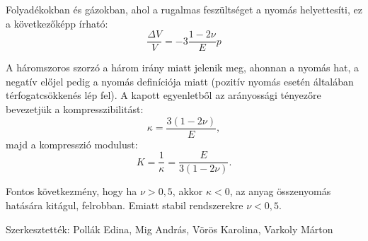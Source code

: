 \documentclass[a4paper, 12pt]{article}
\begin{document}
Folyadékokban és gázokban, ahol a rugalmas feszültséget a nyomás helyettesíti, ez a következőképp írható:
\begin{equation*}
\frac{\Delta V}{V}=-3\frac{1-2\nu}{E}p
\end{equation*}

A háromszoros szorzó a három irány miatt jelenik meg, ahonnan a nyomás hat, a negatív előjel pedig a nyomás definíciója miatt (pozitív nyomás esetén általában térfogatcsökkenés lép fel). A kapott egyenletből az arányossági tényezőre bevezetjük a kompresszibilitást:
\begin{equation*}
\kappa=\frac{3(1-2\nu)}{E},
\end{equation*}
majd a kompresszió modulust: 
\begin{equation*}
K=\frac{1}{\kappa}=\frac{E}{3(1-2\nu)}.
\end{equation*}

Fontos következmény, hogy ha $\nu>0{,}5$, akkor $\kappa<0$, az anyag összenyomás hatására kitágul, felrobban. Emiatt stabil rendszerekre $\nu < 0{,}5$.


Szerkesztették: Pollák Edina, Mig András, Vörös Karolina, Varkoly Márton
\end{document}
